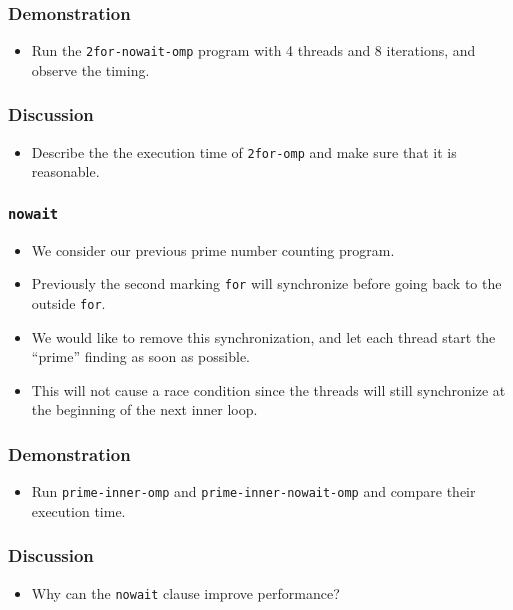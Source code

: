 \documentclass{beamer}
\begin{document}
\begin{frame}
  \frametitle{Demonstration}
  \begin{itemize}
  \item Run the {\tt 2for-nowait-omp} program with 4 threads and 8
    iterations, and observe the timing.
  \end{itemize}
\end{frame}

\begin{frame}
  \frametitle{Discussion}
  \begin{itemize}
  \item Describe the the execution time of {\tt 2for-omp} and make
    sure that it is reasonable.
  \end{itemize}
\end{frame}

\begin{frame}
\frametitle{\tt nowait}
\begin{itemize}
\item We consider our previous prime number counting program.
\item Previously the second marking {\tt for} will synchronize before
  going back to the outside {\tt for}.
\item We would like to remove this synchronization, and let each
  thread start the ``prime'' finding as soon as possible.
\item This will not cause a race condition since the threads will
  still synchronize at the beginning of the next inner loop.
\end{itemize}
\end{frame}

\begin{frame}
\end{frame}

\begin{frame}
  \frametitle{Demonstration}
  \begin{itemize}
  \item Run {\tt prime-inner-omp} and {\tt prime-inner-nowait-omp} and
    compare their execution time.
  \end{itemize}
\end{frame}

\begin{frame}
  \frametitle{Discussion}
  \begin{itemize}
  \item Why can the {\tt nowait} clause improve performance?
  \end{itemize}
\end{frame}
\end{document}
